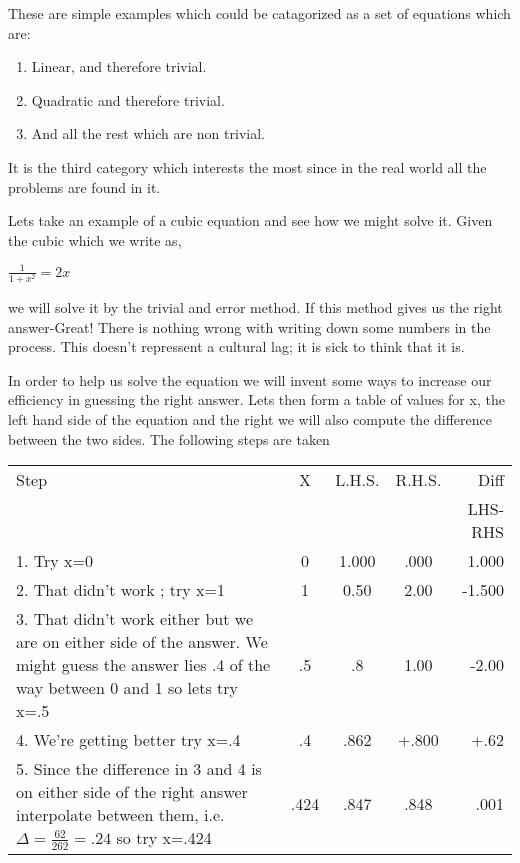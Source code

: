 \documentclass[a4paper,10pt]{article}
\begin{document}
These are simple examples which could be catagorized as a set of equations which are:
\begin{enumerate}
 \item Linear, and therefore trivial.
\item Quadratic and therefore trivial. 
\item And all the rest which are non trivial.
\end{enumerate}

It is the third category which interests the most since in the real world all the problems are found in it.

Lets take an example of a cubic equation and see how we might solve it.  Given the cubic which we write as,

\begin{center}$\frac{1}{1+x^2}=2x$
\end{center}
we will solve it by the trivial and error method.  If this method gives us the right answer-Great! There is nothing
wrong with writing down some numbers in the process. This doesn't repressent a cultural lag; it is sick to think that
it is. 

In order to help us solve the equation we will invent some ways to increase our efficiency in guessing the right answer.
Lets then form a table of values for x, the left hand side of the equation and the right we will also compute the difference
between the two sides.  The following steps are taken
\begin{center}
\begin{tabular}{p{5cm} c c c r}
 \centering Step & X & L.H.S. & R.H.S. & Diff\\
 & & & & {\small LHS-RHS}\\

1. Try x=0 & 0 & 1.000 & .000 & 1.000\\
2. That didn't work ; try x=1 & 1 & 0.50 & 2.00 & -1.500\\
3. That didn't work either but we are on either side of the answer. We might guess the answer
lies .4 of the way between 0 and 1 so lets try x=.5 & .5 & .8 & 1.00 & -2.00\\
4. We're getting better try x=.4 & .4 & .862 & +.800 & +.62\\
5. Since the difference in 3 and 4 is on either side of the right answer interpolate between them, i.e. $\Delta=\frac{62}{262}
=.24$ so try x=.424 & .424 & .847 & .848 &.001
\end{tabular}
\end{center}
\end{document}
